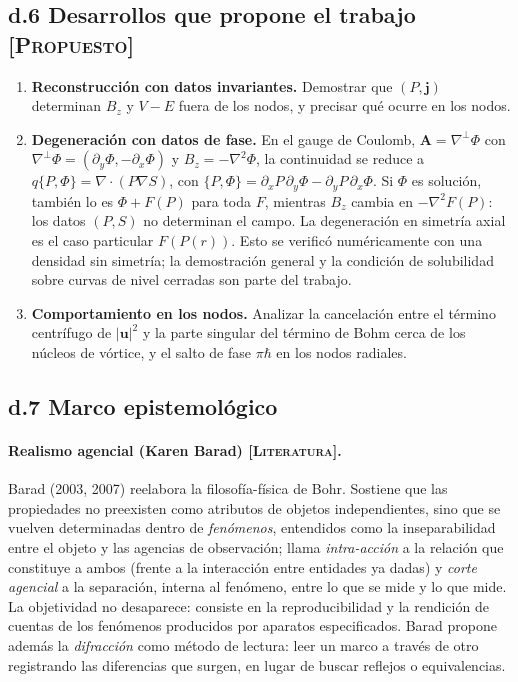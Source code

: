 \documentclass[12pt,letterpaper]{article}
\newcommand{\uv}{\mathbf{u}}
\newcommand{\jv}{\mathbf{j}}
\newcommand{\Av}{\mathbf{A}}
\newcommand{\grad}{\nabla}
\newcommand{\gradp}{\nabla^{\perp}}
\newcommand{\LIT}{\textsc{[Literatura]}}
\newcommand{\PRO}{\textsc{[Propuesto]}}
\begin{document}
\subsection*{d.6 Desarrollos que propone el trabajo \PRO}
\begin{enumerate}[leftmargin=1.8em]
  \item \textbf{Reconstrucción con datos invariantes.} Demostrar que $(P,\jv)$ determinan $B_z$ y $V-E$ fuera de los nodos,
        y precisar qué ocurre en los nodos.
  \item \textbf{Degeneración con datos de fase.} En el gauge de Coulomb, $\Av=\gradp\Phi$ con $\gradp\Phi=(\partial_y\Phi,-\partial_x\Phi)$
        y $B_z=-\grad^2\Phi$, la continuidad se reduce a $q\{P,\Phi\}=\grad\cdot(P\grad S)$, con
        $\{P,\Phi\}=\partial_xP\,\partial_y\Phi-\partial_yP\,\partial_x\Phi$. Si $\Phi$ es solución, también lo es
        $\Phi+F(P)$ para toda $F$, mientras $B_z$ cambia en $-\grad^2F(P)$: los datos $(P,S)$ no determinan el campo.
        La degeneración en simetría axial es el caso particular $F(P(r))$. Esto se verificó numéricamente con una densidad
        sin simetría; la demostración general y la condición de solubilidad sobre curvas de nivel cerradas son parte del
        trabajo.
  \item \textbf{Comportamiento en los nodos.} Analizar la cancelación entre el término centrífugo de $|\uv|^2$ y la parte
        singular del término de Bohm cerca de los núcleos de vórtice, y el salto de fase $\pi\hbar$ en los nodos radiales.
\end{enumerate}

\subsection*{d.7 Marco epistemológico}
\paragraph{Realismo agencial (Karen Barad) \LIT.} Barad (2003, 2007) reelabora la filosofía-física de Bohr. Sostiene que
las propiedades no preexisten como atributos de objetos independientes, sino que se vuelven determinadas dentro de
\emph{fenómenos}, entendidos como la inseparabilidad entre el objeto y las agencias de observación; llama
\emph{intra-acción} a la relación que constituye a ambos (frente a la interacción entre entidades ya dadas) y \emph{corte
agencial} a la separación, interna al fenómeno, entre lo que se mide y lo que mide. La objetividad no desaparece:
consiste en la reproducibilidad y la rendición de cuentas de los fenómenos producidos por aparatos especificados. Barad
propone además la \emph{difracción} como método de lectura: leer un marco a través de otro registrando las diferencias que
surgen, en lugar de buscar reflejos o equivalencias.
\end{document}
